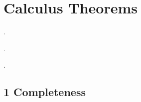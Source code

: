 \chapter{Calculus Theorems}

  {}%
  {}%
  {}%
  {}%
  {\bfseries}%
  {.}%
  { }%
  {}%

  {}%
  {}%
  {}%
  {}%
  {\bfseries}%
  {.}%
  { }%
  {}%

  {}%
  {}%
  {}%
  {}%
  {}%
  {.}%
  { }%
  {}%

\theoremstyle{ethantheorem}
\newtheorem*{theorem}{Theorem}

\theoremstyle{ethannamedtheorem}
\newtheorem*{namedtheorem}{Theorem}

\theoremstyle{ethandefinition}
\newtheorem*{definition}{Definition}

\section*{1 Completeness}

